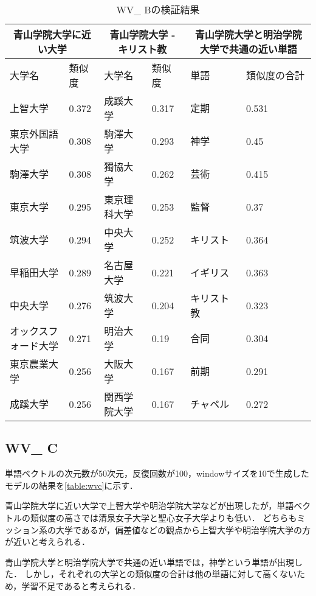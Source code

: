 \begin{table}[H]
\caption{WV\_ Bの検証結果}
\centering
\footnotesize
\begin{tabular}{ll|ll|ll}
\hline
\multicolumn{2}{c}{青山学院大学に近い大学} & \multicolumn{2}{c}{青山学院大学 - キリスト教} & \multicolumn{2}{c}{青山学院大学と明治学院大学で共通の近い単語}
\\ \hline
大学名 & 類似度 & 大学名 & 類似度 & 単語 & 類似度の合計
\\ \hline \hline
上智大学 & 0.372 & 成蹊大学 & 0.317 & 定期 & 0.531\\
東京外国語大学 & 0.308 & 駒澤大学 & 0.293 & 神学 & 0.45\\
駒澤大学 & 0.308 & 獨協大学 & 0.262 & 芸術 & 0.415\\
東京大学 & 0.295 & 東京理科大学 & 0.253 & 監督 & 0.37\\
筑波大学 & 0.294 & 中央大学 & 0.252 & キリスト & 0.364\\
早稲田大学 & 0.289 & 名古屋大学 & 0.221 & イギリス & 0.363\\
中央大学 & 0.276 & 筑波大学 & 0.204 & キリスト教 & 0.323\\
オックスフォード大学 & 0.271 & 明治大学 & 0.19 & 合同 & 0.304\\
東京農業大学 & 0.256 & 大阪大学 & 0.167 & 前期 & 0.291\\
成蹊大学 & 0.256 & 関西学院大学 & 0.167 & チャペル & 0.272\\ \hline
\end{tabular}
\label{table:wvb}
\end{table}


\subsection{WV\_ C}
単語ベクトルの次元数が50次元，反復回数が100，windowサイズを10で生成したモデルの結果を\ref{table:wvc}に示す．

青山学院大学に近い大学で上智大学や明治学院大学などが出現したが，単語ベクトルの類似度の高さでは清泉女子大学と聖心女子大学よりも低い．
どちらもミッション系の大学であるが，偏差値などの観点から上智大学や明治学院大学の方が近いと考えられる．

青山学院大学と明治学院大学で共通の近い単語では，神学という単語が出現した．
しかし，それぞれの大学との類似度の合計は他の単語に対して高くないため，学習不足であると考えられる．

